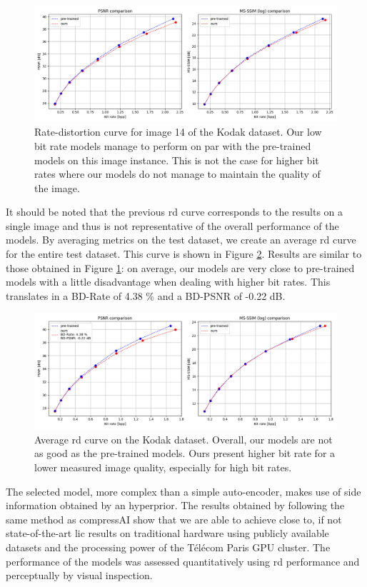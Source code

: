 \begin{figure}
    \centering
    \includegraphics[width=15cm]{../img/bdpsnr_rd_kodak_14.png}
    \caption[Rate-distortion curve for image 14 of the Kodak dataset.]{Rate-distortion curve for image 14 of the Kodak dataset. Our low bit rate models manage to perform on par with the pre-trained models on this image instance. This is not the case for higher bit rates where our models do not manage to maintain the quality of the image.}
    \label{bdpsnr_2}
\end{figure}

It should be noted that the previous \acrshort{rd} curve corresponds to the results on a single image and thus is not representative of the overall performance of the models. By averaging metrics on the test dataset, we create an average \acrshort{rd} curve for the entire test dataset. This curve is shown in Figure \ref{bdpsnr_3}. Results are similar to those obtained in Figure \ref{bdpsnr_2}: on average, our models are very close to pre-trained models with a little disadvantage when dealing with higher bit rates. This translates in a BD-Rate of 4.38 \% and a BD-PSNR of -0.22 dB.

\begin{figure}
    \centering
    \includegraphics[width=15cm]{../img/bdpsnr_rd.png}
    \caption[Average \acrshort{rd} curve on the Kodak dataset.]{Average \acrshort{rd} curve on the Kodak dataset. Overall, our models are not as good as the pre-trained models. Ours present higher bit rate for a lower measured image quality, especially for high bit rates.}
    \label{bdpsnr_3}
\end{figure}

The selected model, more complex than a simple auto-encoder, makes use of side information obtained by an hyperprior. The results obtained by following the same method as compressAI show that we are able to achieve close to, if not state-of-the-art \acrshort{lic} results on traditional hardware using publicly available datasets and the processing power of the Télécom Paris GPU cluster. The performance of the models was assessed quantitatively using \acrshort{rd} performance and perceptually by visual inspection.